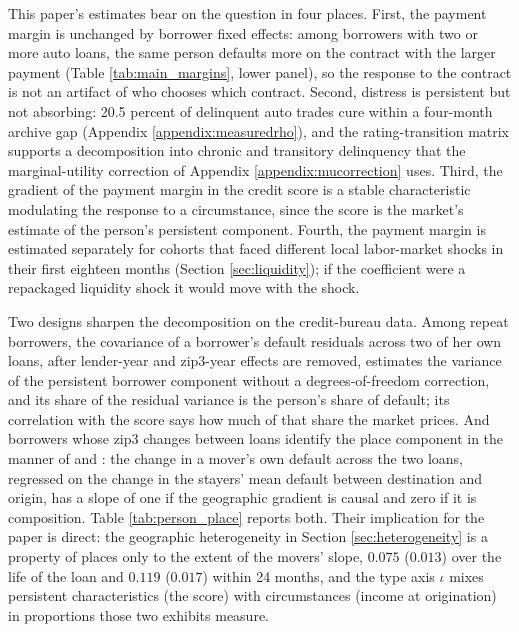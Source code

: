This paper's estimates bear on the question in four places. First, the payment margin is unchanged by borrower fixed effects: among borrowers with two or more auto loans, the same person defaults more on the contract with the larger payment (Table \ref{tab:main_margins}, lower panel), so the response to the contract is not an artifact of who chooses which contract. Second, distress is persistent but not absorbing: 20.5 percent of delinquent auto trades cure within a four-month archive gap (Appendix \ref{appendix:measuredrho}), and the rating-transition matrix supports a decomposition into chronic and transitory delinquency that the marginal-utility correction of Appendix \ref{appendix:mucorrection} uses. Third, the gradient of the payment margin in the credit score is a stable characteristic modulating the response to a circumstance, since the score is the market's estimate of the person's persistent component. Fourth, the payment margin is estimated separately for cohorts that faced different local labor-market shocks in their first eighteen months (Section \ref{sec:liquidity}); if the coefficient were a repackaged liquidity shock it would move with the shock.

Two designs sharpen the decomposition on the credit-bureau data. Among repeat borrowers, the covariance of a borrower's default residuals across two of her own loans, after lender-year and zip3-year effects are removed, estimates the variance of the persistent borrower component without a degrees-of-freedom correction, and its share of the residual variance is the person's share of default; its correlation with the score says how much of that share the market prices. And borrowers whose zip3 changes between loans identify the place component in the manner of \citet{chetty_impacts_2018} and \citet{keys_place_2023}: the change in a mover's own default across the two loans, regressed on the change in the stayers' mean default between destination and origin, has a slope of one if the geographic gradient is causal and zero if it is composition. Table \ref{tab:person_place} reports both. Their implication for the paper is direct: the geographic heterogeneity in Section \ref{sec:heterogeneity} is a property of places only to the extent of the movers' slope, $0.075$ ($0.013$) over the life of the loan and $0.119$ ($0.017$) within 24 months, and the type axis $\iota$ mixes persistent characteristics (the score) with circumstances (income at origination) in proportions those two exhibits measure.


